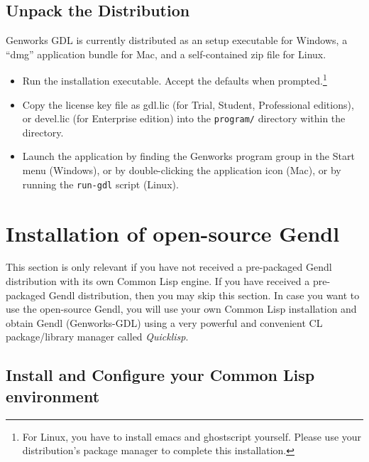 \documentclass [11pt]{book}
\begin{document}
\subsection{Unpack the Distribution}

\label{subsec:unpackthedistribution}

Genworks GDL is currently distributed as an setup executable for Windows,
a ``dmg'' application bundle for Mac, and a self-contained zip file for Linux.

\begin{itemize}

\item Run the installation executable. Accept the defaults when prompted.\footnote{For Linux, you have to install emacs and ghostscript yourself. Please use your distribution's package manager to complete this installation.}

\item Copy the license key file as gdl.lic (for Trial,
	 Student, Professional editions), or devel.lic (for Enterprise edition) into the \texttt{program/} directory within the 
 directory.

\item Launch the application by finding the Genworks program group in the Start menu (Windows), or by double-clicking the application icon (Mac), or by running the \texttt{run-gdl} script (Linux).

\end{itemize}



\section{Installation of open-source Gendl}

\label{sec:installationofopen-sourcegendl}

This section is only relevant if you have not received a
pre-packaged Gendl distribution with its own Common Lisp engine.  If
you have received a pre-packaged Gendl distribution, then you may skip
this section. In case you want to use the open-source Gendl, you will
use your own Common Lisp installation and obtain Gendl (Genworks-GDL)
using a very powerful and convenient CL package/library manager
called \emph{Quicklisp}.

\subsection{Install and Configure your Common Lisp environment}
\end{document}

